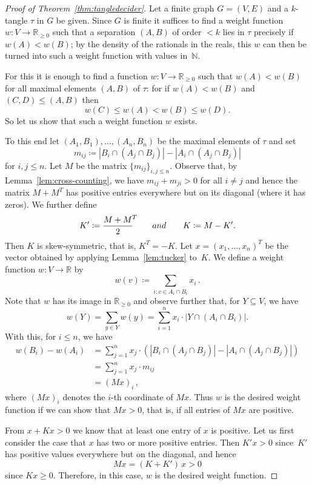 \documentclass[11pt]{article}
\theoremstyle{definition}
\newcommand{\N}{\mathbb{N}}
\newcommand{\R}{\mathbb{R}}
\newcommand{\sub}{\subseteq}
\newcommand{\braces}[1]{\left(#1\right)}
\newcommand{\abs}[1]{\left |#1\right |}
\newcommand{\tn}[1]{\textnormal{#1}}
\begin{document}
\begin{proof}[Proof of Theorem~\ref{thm:tangledecider}]
	Let a finite graph $ G=(V,E) $ and a $ k $-tangle $ \tau $ in $ G $ be given. Since $ G $ is finite it suffices to find a weight function $ {w\colon V\!\to\R_{\ge 0}} $ such that a separation $ (A,B) $ of order $ <k $ lies in $ \tau $ precisely if $ {w(A)<w(B)} $; by the density of the rationals in the reals, this $ w $ can then be turned into such a weight function with values in~$ \N $. 
	
	For this it is enough to find a function $ w\colon V\!\to\R_{\ge 0} $ such that $ w(A)<w(B) $ for all maximal elements $ (A,B) $ of $ \tau $: for if $ w(A)<w(B) $ and $ (C,D)\le(A,B) $ then
	\[ w(C)\le w(A)<w(B)\le w(D). \]
	So let us show that such a weight function $ w $ exists.
	
	To this end let $ (A_1,B_1),\dots,(A_n,B_n) $ be the maximal elements of $ \tau $ and set
	\[ m_{ij}\coloneqq\abs{B_i\cap(A_j\cap B_j)}-\abs{A_i\cap(A_j\cap B_j)} \]
	for $ i,j\le n $. Let $ M $ be the matrix $ \{m_{ij}\}_{i,j\le n} $. Observe that, by Lemma~\ref{lem:cross-counting}, we have $ m_{ij}+m_{ji}>0 $ for all $ i\ne j $ and hence the matrix $ M+M^T $ has positive entries everywhere but on its diagonal (where it has zeros). We further define
	\[ K'\coloneqq\frac{M+\mathrlap{M^T}\phantom{M}}{2}\;\qquad\tn{ and }\qquad K\coloneqq M-K'. \]
	Then $ K $ is skew-symmetric, that is, $ K^T=-K $. Let $ x=(x_1,\dots,x_n)^T $ be the vector obtained by applying Lemma~\ref{lem:tucker} to~$ K $. We define a weight function $ w\colon V\!\to\R $ by
	\[ w(v)\coloneqq\sum_{i\colon v\in A_i\cap B_i}x_i \,. \]
	Note that $ w $ has its image in $ \R_{\ge 0} $ and observe further that, for $ Y\sub V $, we have
	\[ w(Y)=\sum_{y\in Y}w(y)=\sum_{i=1}^{n}x_i\cdot\abs{Y\cap(A_i\cap B_i)}. \]
	With this, for $ i\le n $, we have
	\begin{align*}
	w(B_i)-w(A_i)&=\sum_{j=1}^nx_j\cdot\braces{\abs{B_i\cap(A_j\cap B_j)}-\abs{A_i\cap(A_j\cap B_j)}}\\
	&=\sum_{j=1}^{n}x_j\cdot m_{ij}\\
	&=(Mx)_i\,,
	\end{align*}
	where $ (Mx)_i $ denotes the $ i $-th coordinate of $ Mx $. Thus $ w $ is the desired weight function if we can show that $ Mx>0 $, that is, if all entries of $ Mx $ are positive.
	
	From $ x+Kx>0 $ we know that at least one entry of $ x $ is positive. Let us first consider the case that $ x $ has two or more positive entries. Then $ K'x>0 $ since~$ K' $ has positive values everywhere but on the diagonal, and hence
	\[ Mx=(K+K')\,x>0 \]
	since $ Kx\ge 0 $. Therefore, in this case, $ w $ is the desired weight function.
	

\end{proof}
\end{document}
